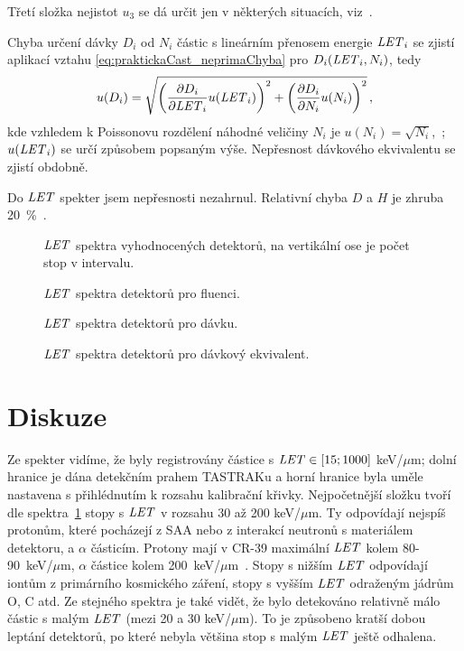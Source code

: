 Třetí složka nejistot $u_3$ se dá určit jen v některých situacích, viz~\cite{nejistoty}.

Chyba určení dávky $D_i$ od $N_i$ částic s lineárním přenosem energie $\mathit{LET}_i$ se zjistí aplikací vztahu \eqref{eq:praktickaCast_neprimaChyba} pro $D_i(\mathit{LET}_i,N_i)$, tedy 
\begin{equation}
  u(D_i)=\sqrt{\left(\frac{\partial D_i}{\partial\mathit{LET}_i}u(\mathit{LET}_i)\right)^2+\left(\frac{\partial D_i}{\partial N_i}u(N_i)\right)^2}\,,
  \label{eq:praktickaCast_chybaDavka}
\end{equation}
kde vzhledem k Poissonovu rozdělení náhodné veličiny $N_i$ je $u(N_i)=\sqrt{N_i}$,~\cite{thesisKPBrabcova}; $u(\mathit{LET}_i)$ se určí způsobem popsaným výše. Nepřesnost dávkového ekvivalentu se zjistí obdobně.

Do $\mathit{LET}$ spekter jsem nepřesnosti nezahrnul. Relativní chyba $D$ a $H$ je zhruba 20~\%~\cite{nejistoty}.
\begin{figure}[H]
  \centering
	\centering
	
	\caption{$\mathit{LET}$ spektra vyhodnocených detektorů, na vertikální ose je počet stop v intervalu.}
	\label{fig:praktickaCast_LETcetnost}
\end{figure}
\begin{figure}[H]
  \centering
	\centering
	
	\caption{$\mathit{LET}$ spektra detektorů pro fluenci.}
	\label{fig:praktickaCast_LETfluence}
\end{figure}
\begin{figure}[H]
  \centering
	\centering
	
	\caption{$\mathit{LET}$ spektra detektorů pro dávku.}
	\label{fig:praktickaCast_LETdavka}
\end{figure}
\begin{figure}[H]
  \centering
	\centering
	
	\caption{$\mathit{LET}$ spektra detektorů pro dávkový ekvivalent.}
	\label{fig:praktickaCast_LETdavkEkvivalent}
\end{figure}
\newpage
\section{Diskuze}
Ze spekter vidíme, že byly registrovány částice s $\mathit{LET}\in[15;1000]$ keV/$\mu$m; dolní hranice je dána detekčním prahem TASTRAKu a horní hranice byla uměle nastavena s přihlédnutím k rozsahu kalibrační křivky. Nejpočetnější složku tvoří dle spektra~\ref{fig:praktickaCast_LETcetnost} stopy s $\mathit{LET}$ v rozsahu 30 až 200 keV/$\mu$m. Ty odpovídají nejspíš protonům, které pocházejí z SAA nebo z interakcí neutronů s materiálem detektoru, a $\alpha$ částicím. Protony mají v CR-39 maximální $\mathit{LET}$ kolem 80-90~keV/$\mu$m, $\alpha$ částice kolem 200~keV/$\mu$m~\cite{SRIM}. Stopy s nižším $\mathit{LET}$ odpovídají iontům z primárního kosmického záření, stopy s vyšším $\mathit{LET}$ odraženým jádrům O, C atd. Ze stejného spektra je také vidět, že bylo detekováno relativně málo částic s malým $\mathit{LET}$ (mezi 20 a 30
keV/$\mu$m). To je způsobeno kratší dobou leptání detektorů, po které nebyla většina stop s malým $\mathit{LET}$ ještě odhalena. 

